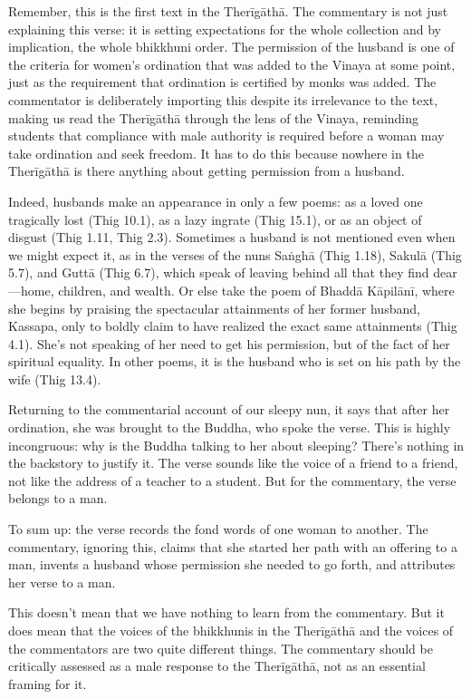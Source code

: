 \documentclass[12pt,openany]{book}%
\begin{document}
Remember, this is the first text in the \textsanskrit{Therīgāthā}. The commentary is not just explaining this verse: it is setting expectations for the whole collection and by implication, the whole bhikkhuni order. The permission of the husband is one of the criteria for women’s ordination that was added to the Vinaya at some point, just as the requirement that ordination is certified by monks was added. The commentator is deliberately importing this despite its irrelevance to the text, making us read the \textsanskrit{Therīgāthā} through the lens of the Vinaya, reminding students that compliance with male authority is required before a woman may take ordination and seek freedom. It has to do this because nowhere in the \textsanskrit{Therīgāthā} is there anything about getting permission from a husband.

Indeed, husbands make an appearance in only a few poems: as a loved one tragically lost (Thig 10.1), as a lazy ingrate (Thig 15.1), or as an object of disgust (Thig 1.11, Thig 2.3). Sometimes a husband is not mentioned even when we might expect it, as in the verses of the nuns \textsanskrit{Saṅghā} (Thig 1.18), \textsanskrit{Sakulā} (Thig 5.7), and \textsanskrit{Guttā} (Thig 6.7), which speak of leaving behind all that they find dear—home, children, and wealth. Or else take the poem of \textsanskrit{Bhaddā} \textsanskrit{Kāpilānī}, where she begins by praising the spectacular attainments of her former husband, Kassapa, only to boldly claim to have realized the exact same attainments (Thig 4.1). She’s not speaking of her need to get his permission, but of the fact of her spiritual equality. In other poems, it is the husband who is set on his path by the wife (Thig 13.4).

Returning to the commentarial account of our sleepy nun, it says that after her ordination, she was brought to the Buddha, who spoke the verse. This is highly incongruous: why is the Buddha talking to her about sleeping? There’s nothing in the backstory to justify it. The verse sounds like the voice of a friend to a friend, not like the address of a teacher to a student. But for the commentary, the verse belongs to a man.

To sum up: the verse records the fond words of one woman to another. The commentary, ignoring this, claims that she started her path with an offering to a man, invents a husband whose permission she needed to go forth, and attributes her verse to a man.

This doesn’t mean that we have nothing to learn from the commentary. But it does mean that the voices of the bhikkhunis in the \textsanskrit{Therīgāthā} and the voices of the commentators are two quite different things. The commentary should be critically assessed as a male response to the \textsanskrit{Therīgāthā}, not as an essential framing for it.
\end{document}

